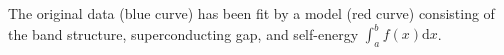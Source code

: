 The original data (blue curve) has been fit by a model (red curve) consisting of the band structure, superconducting gap, and self-energy $\int_a^b f(x)\mathrm{d}x$.